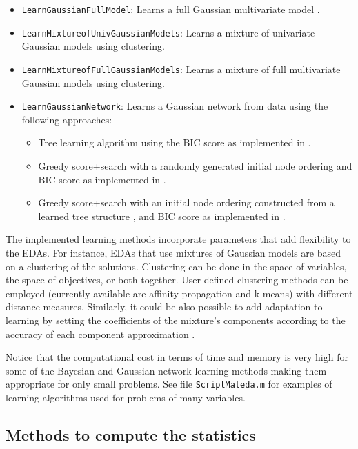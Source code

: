 \documentclass[a4paper]{article}
\begin{document}
\begin{itemize}
   \item \texttt{LearnGaussianFullModel}: Learns a  full Gaussian multivariate model \cite{Larranhaga_et_al:1999}.
  \item \texttt{LearnMixtureofUnivGaussianModels}: Learns a mixture
  of  univariate Gaussian models using clustering.
   \item \texttt{LearnMixtureofFullGaussianModels}: Learns a mixture of
   full  multivariate Gaussian models using clustering.
  \item \texttt{LearnGaussianNetwork}: Learns a Gaussian network from data using the
  following approaches:
  \begin{itemize}
    \item  Tree learning algorithm using the  BIC score as implemented in
    \cite{Leray_and_Francois:2004}.
    \item Greedy score+search  with a randomly generated initial node
    ordering and  BIC score \cite{Cooper_and_Herskovits:1992} as implemented in
     \cite{Murphy:2001}.
    \item Greedy score+search   \cite{Cooper_and_Herskovits:1992} with  an initial node
    ordering constructed from a learned tree structure \cite{Leray_and_Francois:2004}, and BIC score as implemented in
     \cite{Murphy:2001}.
  \end{itemize}
\end{itemize}


The implemented learning methods incorporate parameters that add
flexibility to the EDAs. For instance, EDAs  that use mixtures of
Gaussian models are based on a clustering of the solutions.
Clustering can be done in the space of variables, the space of
objectives, or both together. User defined clustering methods can be
employed (currently available are affinity propagation and k-means)
with  different distance measures. Similarly, it could be also
possible to add adaptation to learning by setting the coefficients
of the mixture's components according to the accuracy of each
component approximation \cite{Santana:2002}.


Notice that the computational cost in terms of time and memory is very high for some of the Bayesian and Gaussian network learning methods making them
appropriate for only small problems. See file \texttt{ScriptMateda.m} for examples of learning algorithms used for problems of many variables.



\subsection{Methods to compute the statistics}
\end{document}
